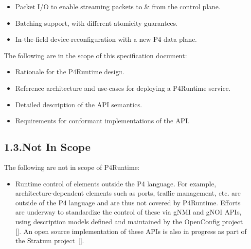 \documentclass[11pt]{article}
\begin{document}
{\begin{itemize}[noitemsep,topsep=\mdcompacttopsep]
\item{}Packet I/O to enable streaming packets to \& from the control plane.%

\item{}Batching support, with different atomicity guarantees.%

\item{}In-the-field device-reconfiguration with a new P4 data plane.%
\end{itemize}%

\noindent{}The following are in the scope of this specification document:%

\begin{itemize}[noitemsep,topsep=\mdcompacttopsep]%

\item{}Rationale for the P4Runtime design.%

\item{}Reference architecture and use-cases for deploying a P4Runtime service.%

\item{}Detailed description of the API semantics.%

\item{}Requirements for conformant implementations of the API.%
\end{itemize}%

\subsection{1.3.\hspace*{0.5em}Not In Scope}\label{sec-not-in-scope}%

\noindent{}The following are not in scope of P4Runtime:%

\begin{itemize}[noitemsep,topsep=\mdcompacttopsep]%

\item{}Runtime control of elements outside the P4 language. For example,
architecture-dependent elements such as ports, traffic management, etc. are
outside of the P4 language and are thus not covered by P4Runtime. Efforts are
underway to standardize the control of these via gNMI and gNOI APIs, using
description models defined and maintained by the OpenConfig project
[]. An open source implementation of these APIs is also in progress
as part of the Stratum project~[].%


\end{itemize}}
\end{document}
